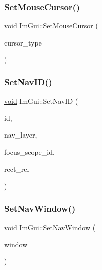 \mbox{\label{namespaceImGui_aca3237fd4efa0af7fc6b4eff6494dfce}} 
\subsubsection{\texorpdfstring{Set\+Mouse\+Cursor()}{SetMouseCursor()}}
{\footnotesize\ttfamily \hyperlink{imgui__impl__opengl3__loader_8h_ac668e7cffd9e2e9cfee428b9b2f34fa7}{void} Im\+Gui\+::\+Set\+Mouse\+Cursor (\begin{DoxyParamCaption}\item[{Im\+Gui\+Mouse\+Cursor}]{cursor\+\_\+type }\end{DoxyParamCaption})}

\mbox{\label{namespaceImGui_a101d94ec7f8e0a219bbaee58558316eb}} 
\subsubsection{\texorpdfstring{Set\+Nav\+I\+D()}{SetNavID()}}
{\footnotesize\ttfamily \hyperlink{imgui__impl__opengl3__loader_8h_ac668e7cffd9e2e9cfee428b9b2f34fa7}{void} Im\+Gui\+::\+Set\+Nav\+ID (\begin{DoxyParamCaption}\item[{Im\+Gui\+ID}]{id,  }\item[{\hyperlink{imgui__internal_8h_afb412215b8327dc2c6af2c19fdca64c6}{Im\+Gui\+Nav\+Layer}}]{nav\+\_\+layer,  }\item[{Im\+Gui\+ID}]{focus\+\_\+scope\+\_\+id,  }\item[{const \hyperlink{structImRect}{Im\+Rect} \&}]{rect\+\_\+rel }\end{DoxyParamCaption})}

\mbox{\label{namespaceImGui_aa422c756f467e650d67b4fb1b74ff5a1}} 
\subsubsection{\texorpdfstring{Set\+Nav\+Window()}{SetNavWindow()}}
{\footnotesize\ttfamily \hyperlink{imgui__impl__opengl3__loader_8h_ac668e7cffd9e2e9cfee428b9b2f34fa7}{void} Im\+Gui\+::\+Set\+Nav\+Window (\begin{DoxyParamCaption}\item[{\hyperlink{structImGuiWindow}{Im\+Gui\+Window} $\ast$}]{window }\end{DoxyParamCaption})}


